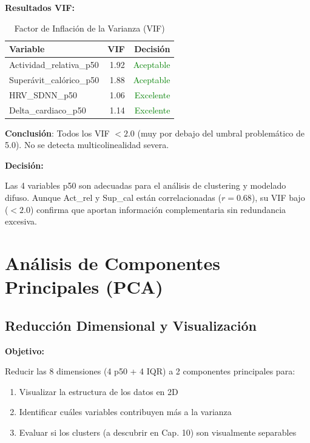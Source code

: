 \documentclass[12pt,letterpaper,twoside]{report}
\begin{document}
\begin{calculobox}
\textbf{Resultados VIF:}

\begin{table}[H]
\centering
\caption{Factor de Inflación de la Varianza (VIF)}
\label{tab:vif}
\begin{tabular}{@{}lrr@{}}
\toprule
\textbf{Variable} & \textbf{VIF} & \textbf{Decisión} \\
\midrule
Actividad\_relativa\_p50     & 1.92 & \textcolor{green}{Aceptable} \\
Superávit\_calórico\_p50     & 1.88 & \textcolor{green}{Aceptable} \\
HRV\_SDNN\_p50               & 1.06 & \textcolor{green}{Excelente} \\
Delta\_cardiaco\_p50         & 1.14 & \textcolor{green}{Excelente} \\
\bottomrule
\end{tabular}
\end{table}

\textbf{Conclusión}: Todos los VIF $< 2.0$ (muy por debajo del umbral problemático de 5.0). No se detecta multicolinealidad severa.
\end{calculobox}

\begin{decisionbox}
\textbf{Decisión:}

Las 4 variables p50 son adecuadas para el análisis de clustering y modelado difuso. Aunque Act\_rel y Sup\_cal están correlacionadas ($r=0.68$), su VIF bajo ($<2.0$) confirma que aportan información complementaria sin redundancia excesiva.
\end{decisionbox}

\section{Análisis de Componentes Principales (PCA)}

\subsection{Reducción Dimensional y Visualización}

\begin{hipotesisbox}
\textbf{Objetivo:}

Reducir las 8 dimensiones (4 p50 + 4 IQR) a 2 componentes principales para:
\begin{enumerate}[noitemsep]
    \item Visualizar la estructura de los datos en 2D
    \item Identificar cuáles variables contribuyen más a la varianza
    \item Evaluar si los clusters (a descubrir en Cap. 10) son visualmente separables
\end{enumerate}
\end{hipotesisbox}
\end{document}
